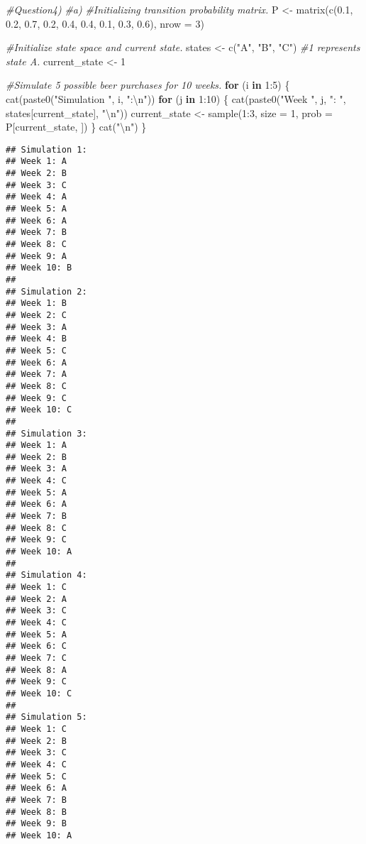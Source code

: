 \documentclass[
]{article}
\newenvironment{Shaded}{\begin{snugshade}}{\end{snugshade}}
\newcommand{\AttributeTok}[1]{\textcolor[rgb]{0.77,0.63,0.00}{#1}}
\newcommand{\CommentTok}[1]{\textcolor[rgb]{0.56,0.35,0.01}{\textit{#1}}}
\newcommand{\ControlFlowTok}[1]{\textcolor[rgb]{0.13,0.29,0.53}{\textbf{#1}}}
\newcommand{\DecValTok}[1]{\textcolor[rgb]{0.00,0.00,0.81}{#1}}
\newcommand{\FloatTok}[1]{\textcolor[rgb]{0.00,0.00,0.81}{#1}}
\newcommand{\FunctionTok}[1]{\textcolor[rgb]{0.00,0.00,0.00}{#1}}
\newcommand{\NormalTok}[1]{#1}
\newcommand{\OtherTok}[1]{\textcolor[rgb]{0.56,0.35,0.01}{#1}}
\newcommand{\SpecialCharTok}[1]{\textcolor[rgb]{0.00,0.00,0.00}{#1}}
\newcommand{\StringTok}[1]{\textcolor[rgb]{0.31,0.60,0.02}{#1}}
\begin{document}
\begin{Shaded}
\begin{Highlighting}[]
\CommentTok{\#Question4)}
\CommentTok{\#a)}
\CommentTok{\#Initializing transition probability matrix.}
\NormalTok{P }\OtherTok{\textless{}{-}} \FunctionTok{matrix}\NormalTok{(}\FunctionTok{c}\NormalTok{(}\FloatTok{0.1}\NormalTok{, }\FloatTok{0.2}\NormalTok{, }\FloatTok{0.7}\NormalTok{, }\FloatTok{0.2}\NormalTok{, }\FloatTok{0.4}\NormalTok{, }\FloatTok{0.4}\NormalTok{, }\FloatTok{0.1}\NormalTok{, }\FloatTok{0.3}\NormalTok{, }\FloatTok{0.6}\NormalTok{), }\AttributeTok{nrow =} \DecValTok{3}\NormalTok{)}

\CommentTok{\#Initialize state space and current state.}
\NormalTok{states }\OtherTok{\textless{}{-}} \FunctionTok{c}\NormalTok{(}\StringTok{"A"}\NormalTok{, }\StringTok{"B"}\NormalTok{, }\StringTok{"C"}\NormalTok{)}
\CommentTok{\#1 represents state A.}
\NormalTok{current\_state }\OtherTok{\textless{}{-}} \DecValTok{1}  

\CommentTok{\#Simulate 5 possible beer purchases for 10 weeks.}
\ControlFlowTok{for}\NormalTok{ (i }\ControlFlowTok{in} \DecValTok{1}\SpecialCharTok{:}\DecValTok{5}\NormalTok{) \{}
  \FunctionTok{cat}\NormalTok{(}\FunctionTok{paste0}\NormalTok{(}\StringTok{"Simulation "}\NormalTok{, i, }\StringTok{":}\SpecialCharTok{\textbackslash{}n}\StringTok{"}\NormalTok{))}
  \ControlFlowTok{for}\NormalTok{ (j }\ControlFlowTok{in} \DecValTok{1}\SpecialCharTok{:}\DecValTok{10}\NormalTok{) \{}
    \FunctionTok{cat}\NormalTok{(}\FunctionTok{paste0}\NormalTok{(}\StringTok{"Week "}\NormalTok{, j, }\StringTok{": "}\NormalTok{, states[current\_state], }\StringTok{"}\SpecialCharTok{\textbackslash{}n}\StringTok{"}\NormalTok{))}
\NormalTok{    current\_state }\OtherTok{\textless{}{-}} \FunctionTok{sample}\NormalTok{(}\DecValTok{1}\SpecialCharTok{:}\DecValTok{3}\NormalTok{, }\AttributeTok{size =} \DecValTok{1}\NormalTok{, }\AttributeTok{prob =}\NormalTok{ P[current\_state, ])}
\NormalTok{  \}}
  \FunctionTok{cat}\NormalTok{(}\StringTok{"}\SpecialCharTok{\textbackslash{}n}\StringTok{"}\NormalTok{)}
\NormalTok{\}}
\end{Highlighting}
\end{Shaded}

\begin{verbatim}
## Simulation 1:
## Week 1: A
## Week 2: B
## Week 3: C
## Week 4: A
## Week 5: A
## Week 6: A
## Week 7: B
## Week 8: C
## Week 9: A
## Week 10: B
## 
## Simulation 2:
## Week 1: B
## Week 2: C
## Week 3: A
## Week 4: B
## Week 5: C
## Week 6: A
## Week 7: A
## Week 8: C
## Week 9: C
## Week 10: C
## 
## Simulation 3:
## Week 1: A
## Week 2: B
## Week 3: A
## Week 4: C
## Week 5: A
## Week 6: A
## Week 7: B
## Week 8: C
## Week 9: C
## Week 10: A
## 
## Simulation 4:
## Week 1: C
## Week 2: A
## Week 3: C
## Week 4: C
## Week 5: A
## Week 6: C
## Week 7: C
## Week 8: A
## Week 9: C
## Week 10: C
## 
## Simulation 5:
## Week 1: C
## Week 2: B
## Week 3: C
## Week 4: C
## Week 5: C
## Week 6: A
## Week 7: B
## Week 8: B
## Week 9: B
## Week 10: A
\end{verbatim}
\end{document}
